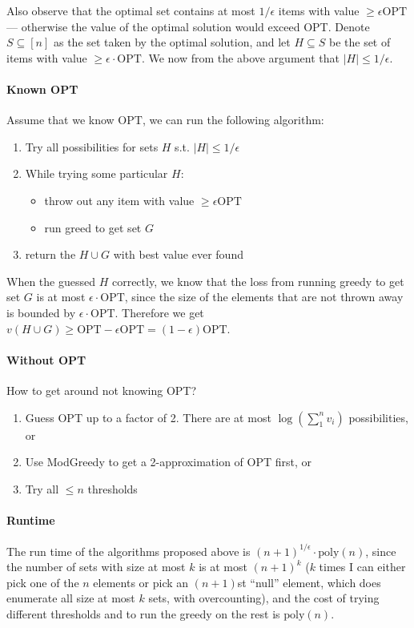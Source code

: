 \documentclass[11pt]{article}
\newcommand{\opt}{\mathrm{OPT}}
\theoremstyle{definition}
\theoremstyle{remark}
\begin{document}
Also observe that the optimal set contains at most $ 1 / \epsilon$ items with value $\geq \epsilon \opt$ --- otherwise the value of the optimal solution would exceed OPT. Denote  $S \subseteq [n]$ as the set taken by the optimal solution, and let $H \subseteq S$ be the set of items with value $\geq \epsilon \cdot \opt$. We now from the above argument that $|H| \leq 1/\epsilon$.


\paragraph{Known OPT} Assume that we know $\opt$, we can run the following algorithm:
\begin{enumerate}
	\item Try all possibilities for sets $H$ s.t. $|H| \leq 1 /\epsilon$
	\item While trying some particular $H$:
	\begin{itemize}
		\item throw out any item with value $\geq \epsilon \opt$
		\item run greed to get set $G$
	\end{itemize}
	\item return the $H\cup G$ with best value ever found
\end{enumerate}

When the guessed $H$ correctly, we know that the loss from running greedy to get set $G$ is at most $\epsilon\cdot \opt$, since the size of the  elements that are not thrown away is bounded by $\epsilon\cdot \opt$. Therefore we get $v(H \cup G) \geq \opt - \epsilon \opt = (1-\epsilon) \opt$.


\paragraph{Without OPT} How to get around not knowing OPT?
\begin{enumerate}
	\item Guess OPT up to a factor of 2. There are at most $\log (\sum_{1}^n v_i)$ possibilities, or
	\item Use ModGreedy to get a 2-approximation of OPT first, or
	\item Try all $\leq n$ thresholds
\end{enumerate}


\paragraph{Runtime} The run time of the algorithms proposed above is $(n+1)^{1/\epsilon} \cdot \mathrm{poly}(n)$, since the number of sets with size at most $k$ is at most $(n+1)^k$ ($k$ times I can either pick one of the $n$ elements or pick an $(n+1)$st ``null'' element, which does enumerate all size at most $k$ sets, with overcounting), and the cost of trying different thresholds and to run the greedy on the rest is $\mathrm{poly}(n)$.
\end{document}
